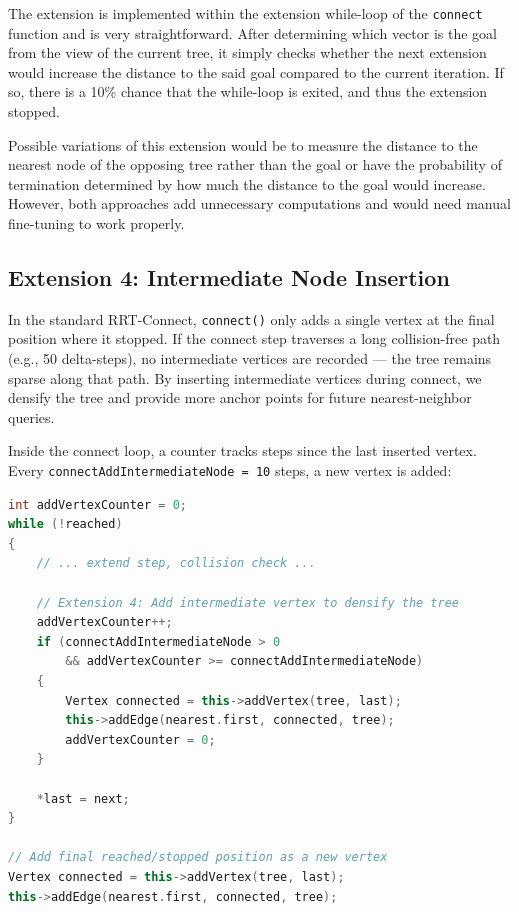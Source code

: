 \documentclass[a4paper,12pt]{article}
\begin{document}
The extension is implemented within the extension while-loop of the \texttt{connect} function and is very straightforward. After determining which vector is the goal from the view of the current tree, it simply checks whether the next extension would increase the distance to the said goal compared to the current iteration. If so, there is a 10\% chance that the while-loop is exited, and thus the extension stopped.

Possible variations of this extension would be to measure the distance to the nearest node of the opposing tree rather than the goal or have the probability of termination determined by how much the distance to the goal would increase. However, both approaches add unnecessary computations and would need manual fine-tuning to work properly.

\subsection*{Extension 4: Intermediate Node Insertion} %
In the standard RRT-Connect, \texttt{connect()} only adds a single vertex at the final position where it stopped. If the connect step traverses a long collision-free path (e.g., 50 delta-steps), no intermediate vertices are recorded --- the tree remains sparse along that path. By inserting intermediate vertices during connect, we densify the tree and provide more anchor points for future nearest-neighbor queries.

Inside the connect loop, a counter tracks steps since the last inserted vertex. Every \texttt{connectAddIntermediateNode = 10} steps, a new vertex is added:

\begin{lstlisting}[language=C++, caption=Implementation of Extension 4]
int addVertexCounter = 0;
while (!reached)
{
    // ... extend step, collision check ...

    // Extension 4: Add intermediate vertex to densify the tree
    addVertexCounter++;
    if (connectAddIntermediateNode > 0
        && addVertexCounter >= connectAddIntermediateNode)
    {
        Vertex connected = this->addVertex(tree, last);
        this->addEdge(nearest.first, connected, tree);
        addVertexCounter = 0;
    }

    *last = next;
}

// Add final reached/stopped position as a new vertex
Vertex connected = this->addVertex(tree, last);
this->addEdge(nearest.first, connected, tree);
\end{lstlisting}
\end{document}

